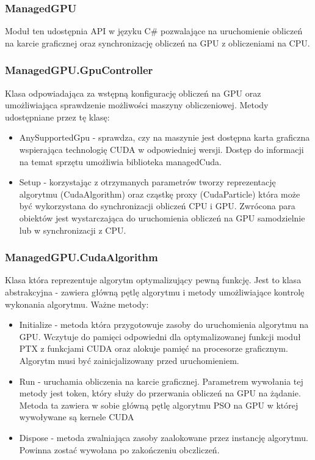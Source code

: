 \documentclass[12pt, twoside, openany, abstract=on]{report}
\theoremstyle{definition}
\begin{document}
\newpage

\subsubsection{ManagedGPU}
Moduł ten udostępnia API w języku C\# pozwalające na uruchomienie obliczeń na karcie graficznej oraz synchronizację obliczeń na GPU z obliczeniami na CPU. 

\subsubsection{ManagedGPU.GpuController} 
Klasa odpowiadająca za wstępną konfigurację obliczeń na GPU oraz umożliwiająca sprawdzenie możliwości maszyny obliczeniowej. Metody udostępniane przez tę klasę:
\begin{itemize}
\item AnySupportedGpu - sprawdza, czy na maszynie jest dostępna karta graficzna wspierająca technologię CUDA w odpowiedniej wersji. Dostęp do informacji na temat sprzętu umożliwia biblioteka managedCuda.
\item Setup - korzystając z otrzymanych parametrów tworzy reprezentację algorytmu (CudaAlgorithm) oraz cząstkę proxy (CudaParticle) która może być wykorzystana do synchronizacji obliczeń CPU i GPU. Zwrócona para obiektów jest wystarczająca do uruchomienia obliczeń na GPU samodzielnie lub w synchronizacji z CPU.
\end{itemize}

\subsubsection{ManagedGPU.CudaAlgorithm} 
Klasa która reprezentuje algorytm optymalizujący pewną funkcję. Jest to klasa abstrakcyjna - zawiera główną pętlę algorytmu i metody umożliwiające kontrolę wykonania algorytmu. Ważne metody:
\begin{itemize}
\item Initialize - metoda która przygotowuje zasoby do uruchomienia algorytmu na GPU. Wczytuje do pamięci odpowiedni dla optymalizowanej funkcji moduł PTX z funkcjami CUDA oraz alokuje pamięć na procesorze graficznym. Algorytm musi być zainicjalizowany przed uruchomieniem.
\item Run - uruchamia obliczenia na karcie graficznej. Parametrem wywołania tej metody jest token, który służy do przerwania obliczeń na GPU na żądanie. Metoda ta zawiera w sobie główną pętlę algorytmu PSO na GPU w której wywoływane są kernele CUDA 
\item Dispose - metoda zwalniająca zasoby zaalokowane przez instancję algorytmu. Powinna zostać wywołana po zakończeniu obczliczeń.
\end{itemize}
\end{document}
